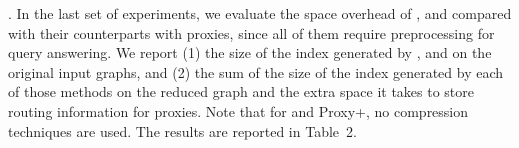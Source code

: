 .
In the last set of experiments, we evaluate the space overhead of \arcflag, \tnr and \ah compared with their counterparts with proxies, since all of them require preprocessing for query answering. We report (1) the size of the index generated by \arcflag, \tnr and \ah on the original input graphs, and (2) the sum of the size of the index generated by each of those methods on the reduced graph and the extra space it takes to store routing information for proxies. Note that for \tnr and Proxy+\tnr, no compression techniques are used. The results are reported in Table~2.



